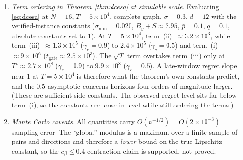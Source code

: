 \documentclass[11pt]{article}
\begin{document}
\begin{enumerate}[(F1)]
{certified collapse time is uninformative at experimental scale.}  At
$\sigma=0.3$, $T=5\times10^4$, $c_\beta=0.4$,
$\gamma\in\{0.05,0.1\}$, $c_0\in\{1,10\}$ and absolute constant set to
$1$, \eqref{eq:leak_horizon} holds with eight orders of magnitude to
spare because $t_{\mathrm{iso}}^*\approx10^{12}$. The
$\widetilde B_\beta$ inflation
($C_{\mathrm{mar}}K_{\mathcal A}^2\alpha_T/\sqrt{\sigma_{\min}}
\approx 7.5\times10^2$) dominates.  The theory's collapse times are
sufficient-side bounds with loose constants, and we make no tightness
claim for them. Exp.~5 shows the practical consequence. The
behavioural collapse of the anytime algorithm is reachable in
simulation only at moderate $N$, and its time is near-flat in $N$
rather than falling like $1/N$.
\item \emph{Term ordering in Theorem~\ref{thm:dcesa} at simulable
scale.}  Evaluating \eqref{eq:dcesa} at $N=16$, $T=5\times10^4$,
complete graph, $\sigma=0.3$, $d=12$ with the verified-instance
constants ($\sigma_{\min}=0.020$, $B_y+S\approx3.95$, $\bar p=0.1$,
$q=0.1$, absolute constants set to $1$). At $T=5\times10^4$,
term~(ii)~$\approx3.2\times10^3$, while
term~(iii)~$\approx1.3\times10^5$ ($\gamma_c=0.9$) to
$2.4\times10^5$ ($\gamma_c=0.5$) and term~(i)~$\approx9\times10^6$
($t_{\mathrm{gate}}\approx2.5\times10^3$).  The $\sqrt T$ term
overtakes term~(iii) only at $T^\star\approx2.7\times10^8$
($\gamma_c=0.9$) to $9.9\times10^8$ ($\gamma_c=0.5$).  A late-window
regret slope near $1$ at $T=5\times10^4$ is therefore what the
theorem's own constants predict, and the $0.5$ asymptotic concerns
horizons four orders of magnitude larger.  (These are
sufficient-side constants. The observed regret level sits far below
term~(i), so the constants are loose in level while still ordering the
terms.)
\item \emph{Monte Carlo caveats.}  All quantities carry
$O(n^{-1/2})=O(2\times10^{-3})$ sampling error. The ``global''
modulus is a maximum over a finite sample of pairs and directions and
therefore a \emph{lower} bound on the true Lipschitz constant, so the
$c_\beta\leq0.4$ contraction claim is supported, not proved.
\end{enumerate}
\end{document}
